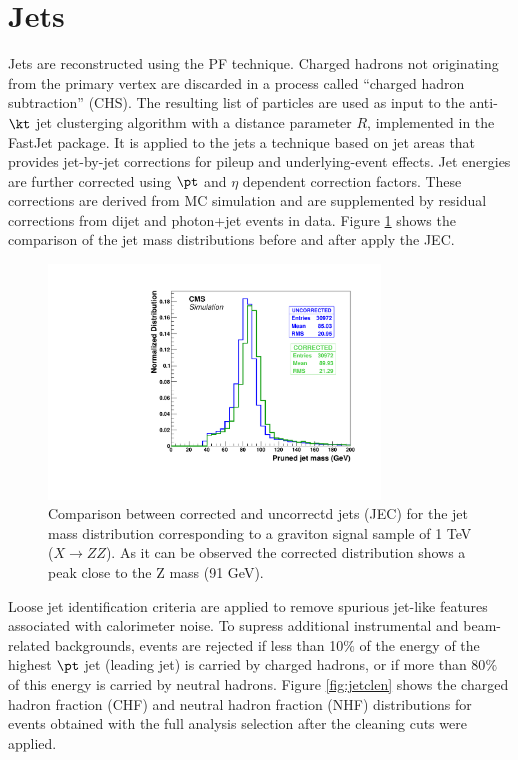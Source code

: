 \section{Jets}\label{jets}

\par Jets are reconstructed using the PF technique. Charged hadrons not originating from the primary vertex are discarded in a process called ``charged hadron subtraction'' (CHS). The resulting list of particles are used as input to the anti-$\kt$ jet clusterging algorithm with a distance parameter $R$, implemented in the FastJet package. It is applied to the jets a technique based on jet areas that provides jet-by-jet corrections for pileup and underlying-event effects. Jet energies are further corrected using $\pt$ and $\eta$ dependent correction factors. These corrections are derived from MC simulation and are supplemented by residual corrections from dijet and photon+jet events in data. Figure \ref{fig:JEC} shows the comparison of the jet mass distributions before and after apply the JEC.

\begin{figure}[!ht]
\caption{Comparison between corrected and uncorrectd jets (JEC) for the jet mass distribution corresponding to a graviton signal sample  of 1 TeV ($X \rightarrow ZZ$). As it can be observed the corrected distribution shows a peak close to the Z mass (91 GeV).}
\begin{center}
\includegraphics[width=250pt]{figures/Objects/jetcomparison.pdf}     
\end{center}
\label{fig:JEC}
\end{figure}

Loose jet identification criteria are applied to remove spurious jet-like features associated with calorimeter noise. To supress additional instrumental and beam-related backgrounds, events are rejected if less than 10$\%$ of the energy of the highest $\pt$ jet (leading jet) is carried by charged hadrons, or if more than 80$\%$ of this energy is carried by neutral hadrons.
Figure \ref{fig:jetclen} shows the charged hadron fraction (CHF) and neutral hadron fraction (NHF) distributions for events obtained with the full analysis selection after the cleaning cuts were applied. 

